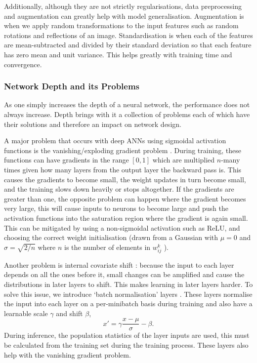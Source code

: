 Additionally, although they are not strictly regularisations, data preprocessing and augmentation can greatly help with model generalisation. Augmentation is when we apply random transformations to the input features such as random rotations and reflections of an image. Standardisation is when each of the features are mean-subtracted and divided by their standard deviation so that each feature has zero mean and unit variance. This helps greatly with training time and convergence. 


\subsubsection{Network Depth and its Problems}
As one simply increases the depth of a neural network, the performance does not always increase. Depth brings with it a collection of problems each of which have their solutions and therefore an impact on network design. 

A major problem that occurs with deep ANNs using sigmoidal activation functions is the vanishing/exploding gradient problem \cite{VanishingGradient}. During training, these functions can have gradients in the range $[0,1]$ which are multiplied $n$-many times given how many layers from the output layer the backward pass is. This causes the gradients to become small, the weight updates in turn become small, and the training slows down heavily or stops altogether. If the gradients are greater than one, the opposite problem can happen where the gradient becomes very large, this will cause inputs to neurons to become large and push the activation functions into the saturation region where the gradient is again small. 
This can be mitigated by using a non-sigmoidal activation such as ReLU, and choosing the correct weight initialisation (drawn from a Gaussian with $\mu=0$ and $\sigma=\sqrt{2/n}$ where $n$ is the number of elements in $w_{ij}^{k}$ \cite{HeEtAl}). 

Another problem is internal covariate shift \cite{BatchNorm}: because the input to each layer depends on all the ones before it, small changes can be amplified and cause the distributions in later layers to shift. This makes learning in later layers harder. 
To solve this issue, we introduce `batch normalisation' layers \cite{BatchNorm}. These layers normalise the input into each layer on a per-minibatch basis during training and also have a learnable scale $\gamma$ and shift $\beta$,
\begin{equation}
    x{'}=\gamma\frac{x-\mu}{\sigma} - \beta.
\end{equation}
During inference, the population statistics of the layer inputs are used, this must be calculated from the training set during the training process. These layers also help with the vanishing gradient problem. 

